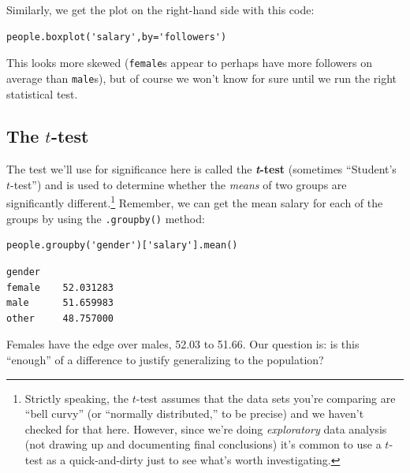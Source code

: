 Similarly, we get the plot on the right-hand side with this code:

\begin{Verbatim}[fontsize=\small,samepage=true,frame=single,framesep=3mm]
people.boxplot('salary',by='followers')
\end{Verbatim}

This looks more skewed (\texttt{female}s appear to perhaps have more followers
on average than \texttt{male}s), but of course we won't know for sure until we
run the right statistical test.

\subsection{The $t$-test}



The test we'll use for significance here is called the \textbf{\textit{t}-test}
(sometimes ``Student's $t$-test'') and is used to determine whether the
\textit{means} of two groups are significantly different.\footnote{Strictly
speaking, the $t$-test assumes that the data sets you're comparing are ``bell
curvy'' (or ``normally distributed,'' to be precise) and we haven't checked for
that here. However, since we're doing \textit{exploratory} data analysis (not
drawing up and documenting final conclusions) it's common to use a $t$-test as
a quick-and-dirty just to see what's worth investigating.} Remember, we can get
the mean salary for each of the groups by using the \texttt{.groupby()} method:

\begin{Verbatim}[fontsize=\small,samepage=true,frame=single,framesep=3mm]
people.groupby('gender')['salary'].mean()
\end{Verbatim}
\vspace{-.2in}

\begin{Verbatim}[fontsize=\small,samepage=true,frame=leftline,framesep=5mm,framerule=1mm]
gender
female    52.031283
male      51.659983
other     48.757000
\end{Verbatim}

Females have the edge over males, 52.03 to 51.66. Our question is: is this
``enough'' of a difference to justify generalizing to the population?

